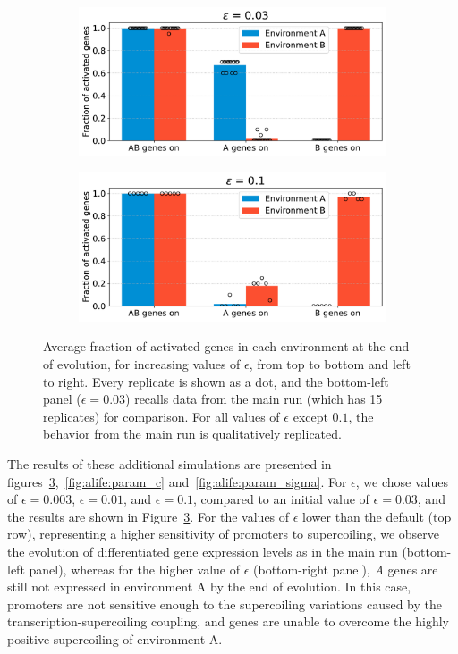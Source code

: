 \begin{figure}[H]
\begin{subfigure}[t]{0.49\textwidth}
\includegraphics[width=\textwidth]{alife/img/mean_activation_epsilon.pdf}
\label{subfig:alife:param_epsilon_3}
\end{subfigure}
\begin{subfigure}[t]{0.49\textwidth}
\includegraphics[width=\textwidth]{alife/img/mean_activation_epsilon-0.1.pdf}
\label{subfig:alife:param_epsilon_4}
\end{subfigure}
\caption[Parameter exploration in the proof-of-concept model: varying $\epsilon$]{Average fraction of activated genes in each environment at the end of evolution, for increasing values of $\epsilon$, from top to bottom and left to right.
Every replicate is shown as a dot, and the bottom-left panel ($\epsilon = 0.03$) recalls data from the main run (which has 15 replicates) for comparison.
For all values of $\epsilon$ except $0.1$, the behavior from the main run is qualitatively replicated.}
\label{fig:alife:param_epsilon}
\end{figure}

The results of these additional simulations are presented in figures~\ref{fig:alife:param_epsilon},~\ref{fig:alife:param_c} and~\ref{fig:alife:param_sigma}.
For $\epsilon$, we chose values of $\epsilon = 0.003$, $\epsilon = 0.01$, and $\epsilon = 0.1$, compared to an initial value of $\epsilon = 0.03$, and the results are shown in Figure~\ref{fig:alife:param_epsilon}.
For the values of $\epsilon$ lower than the default (top row), representing a higher sensitivity of promoters to supercoiling, we observe the evolution of differentiated gene expression levels as in the main run (bottom-left panel), whereas for the higher value of $\epsilon$ (bottom-right panel), \emph{A} genes are still not expressed in environment A by the end of evolution.
In this case, promoters are not sensitive enough to the supercoiling variations caused by the transcription-supercoiling coupling, and genes are unable to overcome the highly positive supercoiling of environment A.

